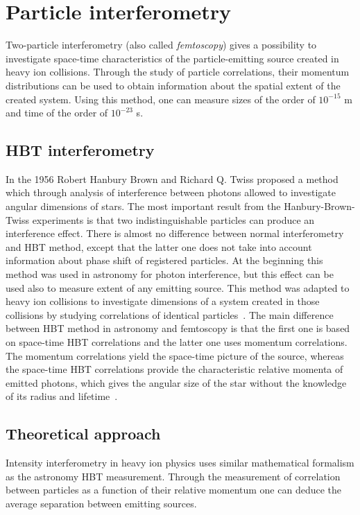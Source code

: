 %
\chapter{Particle interferometry}
  Two-particle interferometry (also called \textit{femtoscopy}) gives a possibility to investigate space-time characteristics of the particle-emitting source created in heavy ion collisions.
  Through the study of particle correlations, their momentum distributions can be used to obtain information about the spatial extent of the created system.
  Using this method, one can measure sizes of the order of $10^{-15}$ m and time of the order of $10^{-23}$ s.
  \section{HBT interferometry}
    In the 1956 Robert Hanbury Brown and Richard Q. Twiss proposed a method which through analysis of interference between photons allowed to investigate angular dimensions of stars.
    The most important result from the Hanbury-Brown-Twiss experiments is that two indistinguishable particles can produce an interference effect.
    There is almost no difference between normal interferometry and HBT method, except that the latter one does not take into account information about phase shift of registered particles.
    At the beginning this method was used in astronomy for photon interference, but this effect can be used also to measure extent of any emitting source.
    This method was adapted to heavy ion collisions to investigate dimensions of a system created in those collisions by studying correlations of identical particles~\cite{nonidfemto}.
    The main difference between HBT method in astronomy and femtoscopy is that the first one is based on space-time HBT correlations and the latter one uses momentum correlations.
    The momentum correlations yield the space-time picture of the source, whereas the space-time HBT correlations provide the characteristic relative momenta of emitted photons, which gives the angular size of the star without the knowledge of its radius and lifetime~\cite{florkowski}.
  \section{Theoretical approach}
    Intensity interferometry in heavy ion physics uses similar mathematical formalism as the astronomy HBT measurement.
    Through the measurement of correlation between particles as a function of their relative momentum one can deduce the average separation between emitting sources.

